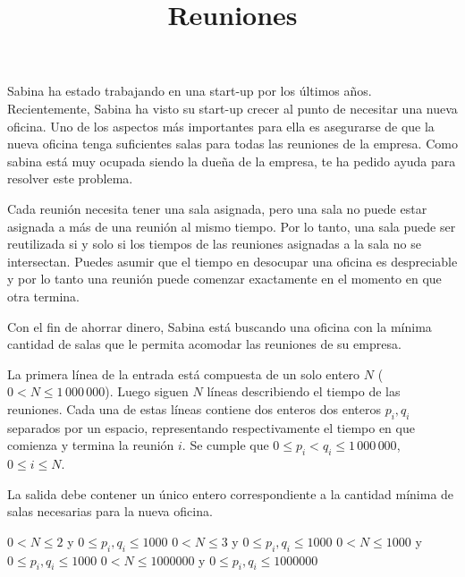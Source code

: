 \documentclass{oci}
\title{Reuniones}
\begin{document}
\begin{problemDescription}
  Sabina ha estado trabajando en una start-up por los últimos años.
  Recientemente, Sabina ha visto su start-up crecer al punto de necesitar una
  nueva oficina.
  Uno de los aspectos más importantes para ella es
  asegurarse de que la nueva oficina tenga suficientes salas para todas las
  reuniones de la empresa.
  Como sabina está muy ocupada siendo la dueña de la empresa, te ha pedido
  ayuda para resolver este problema.

  Cada reunión necesita tener una sala asignada, pero una sala no
  puede estar asignada a más de una reunión al mismo tiempo.
  Por lo tanto, una sala puede ser reutilizada si y solo si los tiempos de las
  reuniones asignadas a la sala no se intersectan.
  Puedes asumir que el tiempo en desocupar una oficina es despreciable y por
  lo tanto una reunión puede comenzar exactamente en el momento en que otra
  termina.

  Con el fin de ahorrar dinero, Sabina está buscando una oficina con la mínima
  cantidad de salas que le permita acomodar las reuniones de su empresa.
\end{problemDescription}

\begin{inputDescription}
    La primera línea de la entrada está compuesta de un solo entero $N$ ($0 < N \leq
    1\,000\,000$).
    Luego siguen $N$ líneas describiendo el tiempo de las reuniones.
    Cada una de estas líneas contiene dos enteros dos enteros $p_i, q_i$
    separados por un espacio, representando respectivamente el tiempo en que
    comienza y termina la reunión $i$.
    Se cumple que $0 \leq p_i< q_i \leq 1\,000\,000$, $0 \leq i \leq N$.
\end{inputDescription}

\begin{outputDescription}
    La salida debe contener un único entero correspondiente a la cantidad
    mínima de salas necesarias para la nueva oficina.
\end{outputDescription}

\begin{scoreDescription}
  $0 < N \leq 2$ y $0 \leq p_i, q_i \leq 1000$
  $0 < N \leq 3$ y $0 \leq p_i, q_i \leq 1000$
  $0 < N \leq 1000$ y $0 \leq p_i, q_i \leq 1000$
  $0 < N \leq 1000000$ y $0 \leq p_i, q_i \leq 1000000$
\end{scoreDescription}

\begin{sampleDescription}
\end{sampleDescription}
\end{document}

